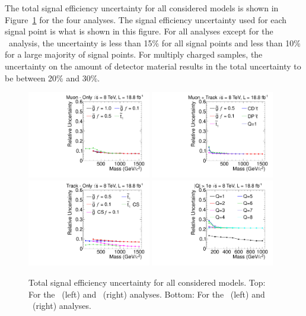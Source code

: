The total signal efficiency uncertainty for all considered models is shown in
Figure~\ref{fig:TotalUnc} for the four analyses. The signal efficiency uncertainty used for each signal point is what is shown in this figure.
For all analyses except for the \multi\ analysis, the uncertainty is less than 15\% for all signal points and less than 10\% for a large majority of signal points.
For multiply charged samples, the uncertainty on the amount of detector material results in the total uncertainty to be between 20\% and 30\%.

\begin{figure}[ht]
\centering
  \includegraphics[clip=false, trim=0.0cm 0cm 0.0cm 0cm, width=0.48\textwidth]{figures/muonly/MOUncertainty}
  \includegraphics[clip=false, trim=0.0cm 0cm 0.0cm 0cm, width=0.48\textwidth]{figures/tkmu/MuUncertainty}
  \includegraphics[clip=false, trim=0.0cm 0cm 0.0cm 0cm, width=0.48\textwidth]{figures/tkonly/TkUncertainty}
  \includegraphics[clip=false, trim=0.0cm 0cm 0.0cm 0cm, width=0.48\textwidth]{figures/multi/HQUncertainty}
\caption[Total signal efficiency uncertainty for all considered models]
{Total signal efficiency uncertainty for all considered models.
Top:  For the \muononly\ (left) and \tktof\ (right) analyses.
Bottom:  For the \tkonly\ (left) and \multi\ (right) analyses.}
    \label{fig:TotalUnc}
\end{figure}

